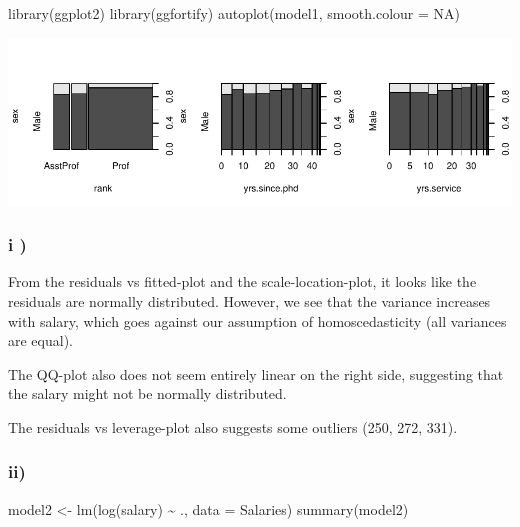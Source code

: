 \documentclass[
]{article}
\newenvironment{Shaded}{\begin{snugshade}}{\end{snugshade}}
\newcommand{\AttributeTok}[1]{\textcolor[rgb]{0.77,0.63,0.00}{#1}}
\newcommand{\ConstantTok}[1]{\textcolor[rgb]{0.00,0.00,0.00}{#1}}
\newcommand{\FunctionTok}[1]{\textcolor[rgb]{0.00,0.00,0.00}{#1}}
\newcommand{\NormalTok}[1]{#1}
\newcommand{\OtherTok}[1]{\textcolor[rgb]{0.56,0.35,0.01}{#1}}
\newcommand{\SpecialCharTok}[1]{\textcolor[rgb]{0.00,0.00,0.00}{#1}}
\begin{document}
\begin{Shaded}
\begin{Highlighting}[]
\FunctionTok{library}\NormalTok{(ggplot2)}
\FunctionTok{library}\NormalTok{(ggfortify)}
\FunctionTok{autoplot}\NormalTok{(model1, }\AttributeTok{smooth.colour =} \ConstantTok{NA}\NormalTok{)}
\end{Highlighting}
\end{Shaded}

\begin{center}\includegraphics{Compulsory-1_files/figure-latex/unnamed-chunk-7-1} \end{center}

\hypertarget{i}{%
\subsubsection{i )}\label{i}}

From the residuals vs fitted-plot and the scale-location-plot, it looks
like the residuals are normally distributed. However, we see that the
variance increases with salary, which goes against our assumption of
homoscedasticity (all variances are equal).

The QQ-plot also does not seem entirely linear on the right side,
suggesting that the salary might not be normally distributed.

The residuals vs leverage-plot also suggests some outliers (250, 272,
331).

\hypertarget{ii}{%
\subsubsection{ii)}\label{ii}}

\begin{Shaded}
\begin{Highlighting}[]
\NormalTok{model2 }\OtherTok{\textless{}{-}} \FunctionTok{lm}\NormalTok{(}\FunctionTok{log}\NormalTok{(salary) }\SpecialCharTok{\textasciitilde{}}\NormalTok{ ., }\AttributeTok{data =}\NormalTok{ Salaries)}
\FunctionTok{summary}\NormalTok{(model2)}
\end{Highlighting}
\end{Shaded}
\end{document}
